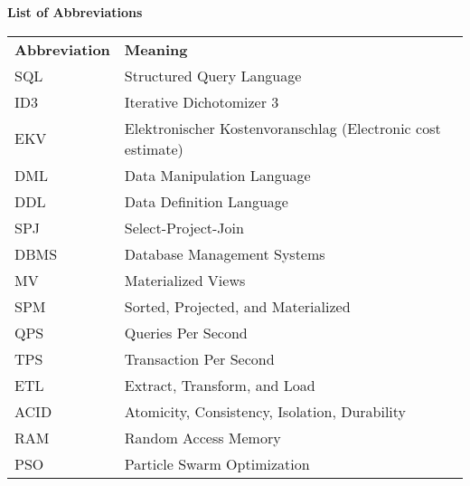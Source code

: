 
% 
\thispagestyle{empty}
\begin{center}
    \huge\textbf{List of Abbreviations}
\end{center}  \vspace{.4cm}

\noindent %

\begin{minipage}{\textwidth}
\begin{tabular}{ll}
    \textbf{Abbreviation} & \textbf{Meaning}\\
    SQL & Structured Query Language\\
    ID3 & Iterative  Dichotomizer 3\\
    EKV & Elektronischer Kostenvoranschlag (Electronic cost estimate)\\
    DML & Data Manipulation Language \\
    DDL & Data Definition Language \\
    SPJ & Select-Project-Join \\
    DBMS & Database Management Systems \\
    {MV} & {Materialized Views} \\
    SPM & Sorted, Projected, and Materialized \\
    QPS & Queries Per Second \\
    TPS & Transaction Per Second \\
    ETL & Extract, Transform, and Load \\
    ACID & Atomicity, Consistency, Isolation, Durability \\
    RAM & Random Access Memory \\
    PSO & Particle Swarm Optimization \\

\end{tabular}
\end{minipage}

% 

    